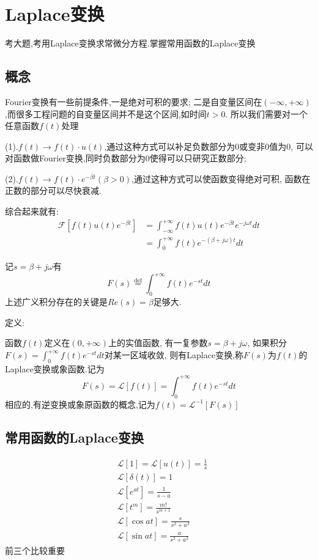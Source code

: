 \documentclass[12pt, a4paper, oneside]{ctexart}
\begin{document}
\section{Laplace变换}
考大题,考用Laplace变换求常微分方程.掌握常用函数的Laplace变换
\subsection{概念}
Fourier变换有一些前提条件,一是绝对可积的要求;
二是自变量区间在$(-\infty,+\infty)$,而很多工程问题的自变量区间并不是这个区间,如时间$t>0$.
所以我们需要对一个任意函数$f(t)$处理

(1).$f(t) \to f(t)\cdot u(t)$,通过这种方式可以补足负数部分为0或变非0值为0,
可以对函数做Fourier变换,同时负数部分为0使得可以只研究正数部分;

(2).$f(t) \to f(t)\cdot e^{-\beta t}(\beta > 0)$,通过这种方式可以使函数变得绝对可积,
函数在正数的部分可以尽快衰减.

综合起来就有:
\begin{align*}
    \mathcal{F}\left[f(t)u(t)e^{-\beta t}\right] &= \int_{-\infty}^{+\infty}f(t)u(t)e^{-\beta t}e^{-j\omega t}dt\\
    &= \int_{0}^{+\infty}f(t)e^{-(\beta +j\omega)t}dt
\end{align*}

记$s = \beta +j \omega$有
\[
    F(s) \stackrel{\text{def}}{=} \int_{0}^{+\infty}f(t)e^{-st}dt
\]
上述广义积分存在的关键是$Re(s) = \beta$足够大.

定义:

函数$f(t)$定义在$(0,+\infty)$上的实值函数,
有一复参数$s = \beta + j\omega$,
如果积分$F(s) = \int_{0}^{+\infty}f(t)e^{-st}dt$对某一区域收敛,
则有Laplace变换,称$F(s)$为$f(t)$的Laplace变换或象函数.记为
\[
    F(s) = \mathcal{L}[f(t)] = \int_{0}^{+\infty}f(t)e^{-st}dt
\]
相应的,有逆变换或象原函数的概念,记为$f(t) = \mathcal{L}^{-1}[F(s)]$
\subsection{常用函数的Laplace变换}
\begin{align*}
    &\mathcal{L}[1] = \mathcal{L}[u(t)] = \frac{1}{s}\\
    &\mathcal{L}\left[\delta(t)\right] = 1\\
    &\mathcal{L}[e^{at}] = \frac{1}{s-a}\\
    &\mathcal{L}[t^m] = \frac{m!}{s^{m+1}}\\
    &\mathcal{L}\left[\cos at\right] = \frac{s}{s^2+a^2}\\
    &\mathcal{L}\left[\sin at\right] = \frac{a}{s^2+a^2}
\end{align*}
前三个比较重要
\end{document}
